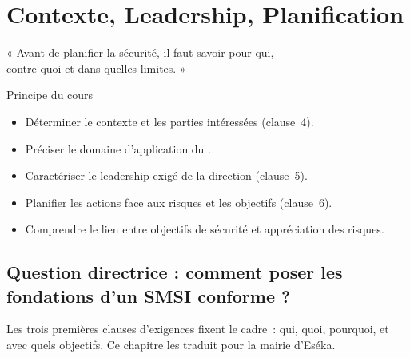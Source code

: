 
\chapter{Contexte, Leadership, Planification}
\label{chap:clauses46}

\epigraph{%
    « Avant de planifier la sécurité, il faut savoir pour qui,\\
    contre quoi et dans quelles limites. »%
}{Principe du cours}


\begin{boxobjectifs}
\begin{itemize}
    \item Déterminer le contexte et les parties intéressées (clause~4).
    \item Préciser le domaine d'application du .
    \item Caractériser le leadership exigé de la direction (clause~5).
    \item Planifier les actions face aux risques et les objectifs (clause~6).
    \item Comprendre le lien entre objectifs de sécurité et appréciation des
          risques.
\end{itemize}
\end{boxobjectifs}

\bigskip

\section*{Question directrice : comment poser les fondations d'un SMSI conforme ?}

Les trois premières clauses d'exigences fixent le cadre~: qui, quoi, pourquoi,
et avec quels objectifs. Ce chapitre les traduit pour la mairie d'Eséka.

